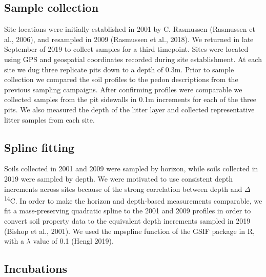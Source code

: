 \documentclass[english,man,floatsintext]{apa6}
\begin{document}
\hypertarget{sample-collection}{%
\subsection{Sample collection}\label{sample-collection}}

Site locations were initially established in 2001 by C. Rasmussen (Rasmussen et al., 2006), and resampled in 2009 (Rasmussen et al., 2018). We returned in late September of 2019 to collect samples for a third timepoint. Sites were located using GPS and geospatial coordinates recorded during site establishment. At each site we dug three replicate pits down to a depth of 0.3m. Prior to sample collection we compared the soil profiles to the pedon descriptions from the previous sampling campaigns. After confirming profiles were comparable we collected samples from the pit sidewalls in 0.1m increments for each of the three pits. We also measured the depth of the litter layer and collected representative litter samples from each site.

\hypertarget{spline-fitting}{%
\subsection{Spline fitting}\label{spline-fitting}}

Soils collected in 2001 and 2009 were sampled by horizon, while soils collected in 2019 were sampled by depth. We were motivated to use consistent depth increments across sites because of the strong correlation between depth and \(\Delta\)\textsuperscript{14}C. In order to make the horizon and depth-based measurements comparable, we fit a mass-preserving quadratic spline to the 2001 and 2009 profiles in order to convert soil property data to the equivalent depth increments sampled in 2019 (Bishop et al., 2001). We used the mpspline function of the GSIF package in R, with a \(\lambda\) value of 0.1 (Hengl 2019).

\hypertarget{incubations}{%
\subsection{Incubations}\label{incubations}}
\end{document}
